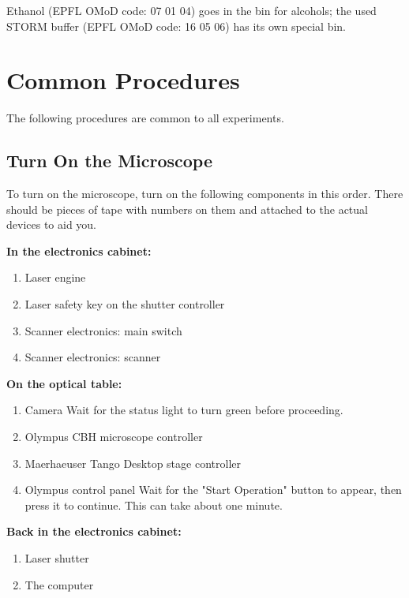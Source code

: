 \documentclass[10pt,a4paper,oneside]{book}
\begin{document}
Ethanol (EPFL OMoD code: 07 01 04) goes in the bin for alcohols; the used STORM buffer (EPFL OMoD code: 16 05 06) has its own special bin.

\section{Common Procedures}

The following procedures are common to all experiments.

\subsection{Turn On the Microscope}\label{sec:startup}

To turn on the microscope, turn on the following components in this order. There should be pieces of tape with numbers on them and attached to the actual devices to aid you.

\textbf{In the electronics cabinet:}

\begin{enumerate}
    \item Laser engine
    \item Laser safety key on the shutter controller
    \item Scanner electronics: main switch
    \item Scanner electronics: scanner
\end{enumerate}

\textbf{On the optical table:}

\begin{enumerate}
    \item Camera \newline Wait for the status light to turn green before proceeding.
    \item Olympus CBH microscope controller
    \item Maerhaeuser Tango Desktop stage controller
    \item Olympus control panel \newline Wait for the "Start Operation" button to appear, then press it to continue. This can take about one minute.
\end{enumerate}

\textbf{Back in the electronics cabinet:}

\begin{enumerate}
    \item Laser shutter
    \item The computer
\end{enumerate}
\end{document}
